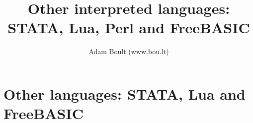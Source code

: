 \documentclass[oneside]{book}
\begin{document}
\author{Adam Boult (www.bou.lt)}
\title{Other interpreted languages: STATA, Lua, Perl and FreeBASIC}
\maketitle

\setcounter{tocdepth}{0}
\tableofcontents



\part{Other languages: STATA, Lua and FreeBASIC}




\end{document}
